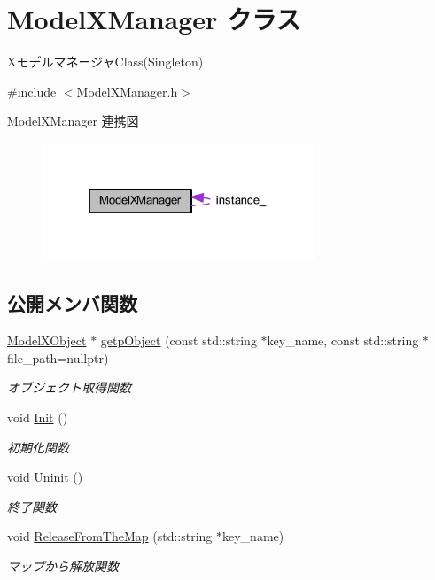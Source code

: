 \hypertarget{class_model_x_manager}{}\section{Model\+X\+Manager クラス}
\label{class_model_x_manager}


Xモデルマネージャ\+Class(\+Singleton)  




{\ttfamily \#include $<$Model\+X\+Manager.\+h$>$}



Model\+X\+Manager 連携図\nopagebreak
\begin{figure}[H]
\begin{center}
\leavevmode
\includegraphics[width=230pt]{class_model_x_manager__coll__graph}
\end{center}
\end{figure}
\subsection*{公開メンバ関数}
\begin{DoxyCompactItemize}
\item 
\mbox{\hyperlink{class_model_x_object}{Model\+X\+Object}} $\ast$ \mbox{\hyperlink{class_model_x_manager_ab4c3b09885b975da1e42644b5335472f}{getp\+Object}} (const std\+::string $\ast$key\+\_\+name, const std\+::string $\ast$file\+\_\+path=nullptr)
\begin{DoxyCompactList}\small\item\em オブジェクト取得関数 \end{DoxyCompactList}\item 
void \mbox{\hyperlink{class_model_x_manager_a77fcb11b4229352c68e61736935a7ece}{Init}} ()
\begin{DoxyCompactList}\small\item\em 初期化関数 \end{DoxyCompactList}\item 
void \mbox{\hyperlink{class_model_x_manager_aac833fc6c1ad4c491f9e68b7e5d5af99}{Uninit}} ()
\begin{DoxyCompactList}\small\item\em 終了関数 \end{DoxyCompactList}\item 
void \mbox{\hyperlink{class_model_x_manager_ab7182ee338b307e32c26f110bb651c4b}{Release\+From\+The\+Map}} (std\+::string $\ast$key\+\_\+name)
\begin{DoxyCompactList}\small\item\em マップから解放関数 \end{DoxyCompactList}\end{DoxyCompactItemize}
